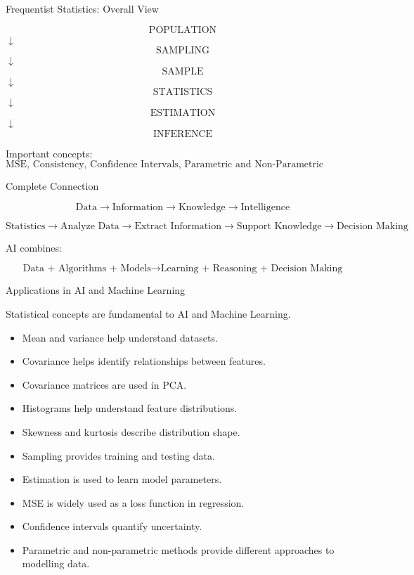 \documentclass[aspectratio=169]{beamer}
\begin{document}
\begin{frame}{Frequentist Statistics: Overall View}
\begin{center}
\[
\boxed{\text{POPULATION}}
\]
$\downarrow$
\[
\boxed{\text{SAMPLING}}
\]
$\downarrow$
\[
\boxed{\text{SAMPLE}}
\]
$\downarrow$
\[
\boxed{\text{STATISTICS}}
\]
$\downarrow$
\[
\boxed{\text{ESTIMATION}}
\]
$\downarrow$
\[
\boxed{\text{INFERENCE}}
\]
\end{center}

Important concepts:
\[
\text{MSE,\ Consistency,\ Confidence Intervals,\ Parametric and Non-Parametric Estimation}
\]
\end{frame}

\begin{frame}{Complete Connection}

\begin{center}
\Large
\[
\boxed{
\text{Data}
\rightarrow
\text{Information}
\rightarrow
\text{Knowledge}
\rightarrow
\text{Intelligence}
}
\]
\end{center}

\vspace{0.4cm}

\[
\boxed{
\text{Statistics}
\rightarrow
\text{Analyze Data}
\rightarrow
\text{Extract Information}
\rightarrow
\text{Support Knowledge}
\rightarrow
\text{Decision Making}
}
\]

\vspace{0.4cm}

AI combines:

\[
\boxed{
\text{Data + Algorithms + Models}
\rightarrow
\text{Learning + Reasoning + Decision Making}
}
\]

\end{frame}

\begin{frame}{Applications in AI and Machine Learning}

Statistical concepts are fundamental to AI and Machine Learning.

\begin{itemize}
    \item Mean and variance help understand datasets.
    \item Covariance helps identify relationships between features.
    \item Covariance matrices are used in PCA.
    \item Histograms help understand feature distributions.
    \item Skewness and kurtosis describe distribution shape.
    \item Sampling provides training and testing data.
    \item Estimation is used to learn model parameters.
    \item MSE is widely used as a loss function in regression.
    \item Confidence intervals quantify uncertainty.
    \item Parametric and non-parametric methods provide different approaches to modelling data.
\end{itemize}
\end{frame}
\end{document}
